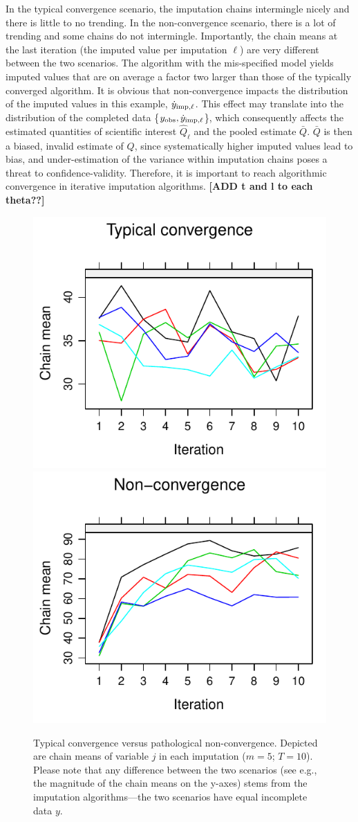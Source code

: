 \documentclass[Royal,times,sageh]{sagej}
\begin{document}
In the typical convergence scenario, the imputation chains intermingle nicely and there is little to no trending. In the non-convergence scenario, there is a lot of trending and some chains do not intermingle. Importantly, the chain means at the last iteration (the imputed value per imputation \(\ell\)) are very different between the two scenarios. The algorithm with the mis-specified model yields imputed values that are on average a factor two larger than those of the typically converged algorithm. It is obvious that non-convergence impacts the distribution of the imputed values in this example, \(\dot y_{\rm imp, \ell}\). This effect may translate into the distribution of the completed data \{\(y_{\rm obs}, \dot y_{\rm imp, \ell}\)\}, which consequently affects the estimated quantities of scientific interest \(\hat{Q}_{\ell}\) and the pooled estimate \(\bar{Q}\). \(\bar{Q}\) is then a biased, invalid estimate of \(Q\), since systematically higher imputed values lead to bias, and under-estimation of the variance within imputation chains poses a threat to confidence-validity. Therefore, it is important to reach algorithmic convergence in iterative imputation algorithms. \textbf{{[}ADD t and l to each theta??{]}}

\begin{figure}

{\centering \includegraphics[width=.49\linewidth]{2.Manuscript_files/figure-latex/non-conv-1} \includegraphics[width=.49\linewidth]{2.Manuscript_files/figure-latex/non-conv-2} 

}

\caption{Typical convergence versus pathological non-convergence. Depicted are chain means of variable $j$ in each imputation ($m=5$; $T=10$). Please note that any difference between the two scenarios (see e.g., the magnitude of the chain means on the y-axes) stems from the imputation algorithms---the two scenarios have equal incomplete data $y$.}\label{fig:non-conv}
\end{figure}
\end{document}
